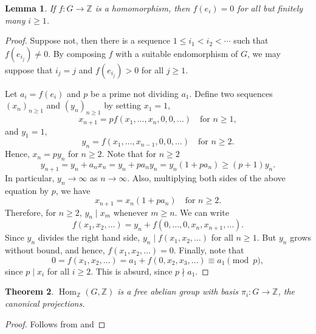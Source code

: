 \documentclass[12pt]{article}
\theoremstyle{thmstyle}
\newtheorem{theorem}{Theorem}
\newtheorem{lemma}[theorem]{Lemma}
\theoremstyle{defstyle}
\newcommand{\Z}{\mathbb{Z}}
\newcommand{\Hom}{\operatorname{Hom}}
\renewcommand{\le}{\leqslant}
\renewcommand{\ge}{\geqslant}
\begin{document}
\begin{lemma}
    If $f: G\to\Z$ is a homomorphism, then $f(e_i) = 0$ for all but finitely many $i\ge 1$.
\end{lemma}
\begin{proof}
    Suppose not, then there is a sequence $1\le i_1 < i_2 < \cdots$ such that $f(e_{i_j})\ne 0$. By composing $f$ with a suitable endomorphism of $G$, we may suppose that $i_j = j$ and $f(e_{i_j}) > 0$ for all $j\ge 1$.

    Let $a_i = f(e_i)$ and $p$ be a prime not dividing $a_1$. Define two sequences $(x_n)_{n\ge 1}$ and $(y_n)_{n\ge 1}$ by setting $x_1 = 1$,
    \begin{equation*}
        x_{n + 1} = pf(x_1,\dots,x_n,0,0,\dots)\quad\text{for }n\ge 1,
    \end{equation*}
    and 
    $y_1 = 1$, 
    \begin{equation*}
        y_{n} = f(x_1,\dots,x_{n - 1},0,0,\dots)\quad\text{for }n\ge 2.
    \end{equation*}
    Hence, $x_n = py_n$ for $n\ge 2$.
    Note that for $n\ge 2$
    \begin{equation*}
        y_{n + 1} = y_n + a_nx_n = y_n + pa_ny_n = y_n(1 + pa_n)\ge (p + 1)y_n.
    \end{equation*}
    In particular, $y_n\to\infty$ as $n\to\infty$. Also, multiplying both sides of the above equation by $p$, we have 
    \begin{equation*}
        x_{n + 1} = x_n(1 + pa_n)\quad\text{for }n\ge 2.
    \end{equation*}
    Therefore, for $n\ge 2$, $y_n\mid x_m$ whenever $m\ge n$. We can write 
    \begin{equation*}
        f(x_1,x_2,\dots) = y_n + f(0,\dots,0,x_n,x_{n + 1},\dots).
    \end{equation*}
    Since $y_n$ divides the right hand side, $y_n\mid f(x_1,x_2,\dots)$ for all $n\ge 1$. But $y_n$ grows without bound, and hence, $f(x_1,x_2,\dots) = 0$. Finally, note that 
    \begin{equation*}
        0 = f(x_1,x_2,\dots) = a_1 + f(0,x_2,x_3,\dots)\equiv a_1\pmod p,
    \end{equation*}
    since $p\mid x_i$ for all $i\ge 2$. This is absurd, since $p\nmid a_1$.
\end{proof}

\begin{theorem}
    $\Hom_{\Z}(G,\Z)$ is a free abelian group with basis $\pi_i: G\to\Z$, the canonical projections.
\end{theorem}
\begin{proof}
    Follows from  and 
\end{proof}
\end{document}
